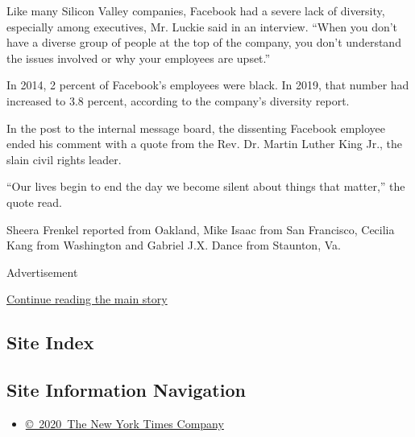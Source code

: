 Like many Silicon Valley companies, Facebook had a severe lack of
diversity, especially among executives, Mr. Luckie said in an interview.
``When you don't have a diverse group of people at the top of the
company, you don't understand the issues involved or why your employees
are upset.''

In 2014, 2 percent of Facebook's employees were black. In 2019, that
number had increased to 3.8 percent, according to the company's
diversity report.

In the post to the internal message board, the dissenting Facebook
employee ended his comment with a quote from the Rev. Dr. Martin Luther
King Jr., the slain civil rights leader.

``Our lives begin to end the day we become silent about things that
matter,'' the quote read.

Sheera Frenkel reported from Oakland, Mike Isaac from San Francisco,
Cecilia Kang from Washington and Gabriel J.X. Dance from Staunton, Va.

Advertisement

\protect\hyperlink{after-bottom}{Continue reading the main story}

\hypertarget{site-index}{%
\subsection{Site Index}\label{site-index}}

\hypertarget{site-information-navigation}{%
\subsection{Site Information
Navigation}\label{site-information-navigation}}

\begin{itemize}
\tightlist
\item
  \href{https://help.nytimes.com/hc/en-us/articles/115014792127-Copyright-notice}{©~2020~The
  New York Times Company}
\end{itemize}

